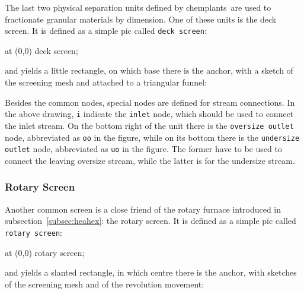 \documentclass[12pt]{article}						%
\newcommand*{\chpn}[1]{\texttt{#1}}				%
\newcommand*{\chpp}[1]{\texttt{#1}}				%
\newcommand*{\chemplants}{chemplants}
\begin{document}
The last two physical separation units defined by \chemplants\ are used to
fractionate granular materials by dimension. One of these units is the deck
screen. It is defined as a simple pic called \chpp{deck screen}:
\begin{chpcode}
	\pic at (0,0) {deck screen};
\end{chpcode}
and yields a little rectangle, on which base there is the anchor, with a sketch
of the screening mesh and attached to a triangular funnel:
\begin{center}
\end{center}

Besides the common nodes, special nodes are defined for stream connections. In
the above drawing, \chpn{i} indicate the \chpn{inlet} node, which should be used
to connect the inlet stream. On the bottom right of the unit there is the
\chpn{oversize outlet} node, abbreviated as \chpn{oo} in the figure, while on its
bottom there is the \chpn{undersize outlet} node, abbreviated as \chpn{uo} in the
figure. The former have to be used to connect the leaving oversize stream, while
the latter is for the undersize stream.

\subsubsection{Rotary Screen}

Another common screen is a close friend of the rotary furnace introduced in
subsection~\ref{subsec:heahex}: the rotary screen. It is defined as a simple
pic called \chpp{rotary screen}:
\begin{chpcode}
	\pic at (0,0) {rotary screen};
\end{chpcode}
and yields a slanted rectangle, in which centre there is the anchor, with
sketches of the screening mesh and of the revolution movement:
\begin{center}
\end{center}
\end{document}
